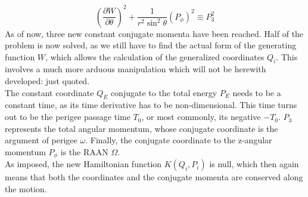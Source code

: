 %
\begin{equation}
\left(\dfrac{\partial W}{\partial \theta}\right)^2 + \dfrac{1}{r^2 \sin^2 \theta} \left(P_{\phi} \right)^2 \equiv P_3^2
\end{equation}
%
\indent As of now, three new constant conjugate momenta have been reached. Half of the problem is now solved, as we still have to find the actual form of the generating function $W$, which allows the calculation of the generalized coordinates $Q_i$. This involves a much more arduous manipulation which will not be herewith developed: just quoted. \\
%
\indent The constant coordinate $Q_E$ conjugate to the total energy $P_E$ needs to be a constant time, as its time derivative has to be non-dimensional. This time turns out to be the perigee passage time $T_0$, or most commonly, its negative $- T_0$. $P_3$ represents the total angular momentum, whose conjugate coordinate is the argument of perigee $\omega$. Finally, the conjugate coordinate to the z-angular momentum $P_{\phi}$ is the RAAN $\Omega$.\\
%
\indent As imposed, the new Hamiltonian function $K(Q_i, P_i)$ is null, which then again means that both the coordinates and the conjugate momenta are conserved along the motion.
